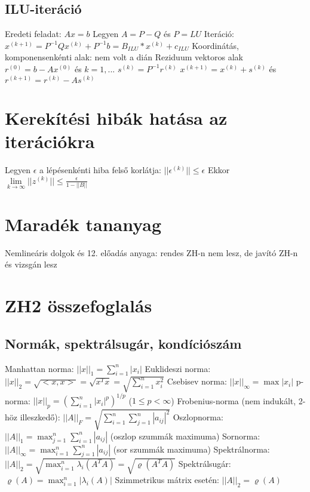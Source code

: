 \documentclass[12pt,a4paper]{article}
\begin{document}
\subsection{ILU-iteráció}

\begin{outline}
	\1 Eredeti feladat: $Ax=b$
	\1 Legyen $A = P-Q$ és $P=LU$
	\1 Iteráció: $x^{(k+1)} = P^{-1} Q x^{(k)} + P^{-1} b = B_{ILU} * x^{(k)} + c_{ILU}$
	\1 Koordinátás, komponensenkénti alak: nem volt a dián
	\1 Reziduum vektoros alak
		\2 $r^{(0)} = b - Ax^{(0)}$ és $k=1,...$
		\2 $s^{(k)} = P^{-1} r^{(k)}$
		\2 $x^{(k+1)} = x^{(k)} + s^{(k)}$ és $r^{(k+1)} = r^{(k)} - As^{(k)}$
\end{outline}

\pagebreak

\section{Kerekítési hibák hatása az iterációkra}

\begin{outline}
	\1 Legyen $\epsilon$ a lépésenkénti hiba felső korlátja: $||\epsilon^{(k)}|| \le \epsilon$
	\1 Ekkor $\lim\limits_{k \to \infty} ||z^{(k)}|| \le \frac{\epsilon}{1 - ||B||}$
\end{outline}

\section{Maradék tananyag}

\begin{outline}
	\1 Nemlineáris dolgok és 12. előadás anyaga: rendes ZH-n nem lesz, de javító ZH-n és vizsgán lesz

\end{outline}

\pagebreak

\section{ZH2 összefoglalás}

\subsection{Normák, spektrálsugár, kondíciószám}

\begin{outline}
	\1 Manhattan norma: $||x||_1 = \sum_{i=1}^n |x_i|$
	\1 Euklideszi norma: $||x||_2 = \sqrt{<x,x>} = \sqrt{x^Tx} = \sqrt{\sum_{i=1}^{n} x_i^2}$
	\1 Csebisev norma: $||x||_\infty = \max |x_i|$
	\1 p-norma: $||x||_p = (\sum_{i=1}^{n} |x_i|^p)^{1/p}$ \;\; ($1 \le p < \infty$)
	\1 Frobenius-norma (nem indukált, 2-höz illeszkedő): $||A||_F = \sqrt{ \sum_{i=1}^{n} \sum_{j=1}^{n} |a_{ij}|^2 }$
	\1 Oszlopnorma: $||A||_1 = \max_{j=1}^n \sum_{i=1}^{n} |a_{ij}|$ \;\; (oszlop szummák maximuma)
	\1 Sornorma: $||A||_\infty = \max_{i=1}^n \sum_{j=1}^{n} |a_{ij}|$ \;\; (sor szummák maximuma)
	\1 Spektrálnorma: $||A||_2 = \sqrt{\max_{i=1}^{n} \lambda_i (A^T A)} = \sqrt{\varrho(A^TA)}$
		\2 Spektrálsugár: $\varrho(A) = \max_{i=1}^{n} |\lambda_i (A)|$
		\2 Szimmetrikus mátrix esetén: $||A||_2 = \varrho(A)$
\end{outline}
\end{document}
